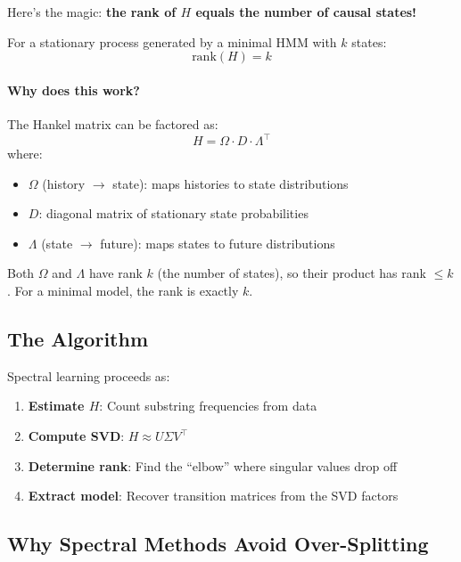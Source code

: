 \documentclass[11pt,a4paper]{article}
\theoremstyle{definition}
\theoremstyle{plain}
\begin{document}
Here's the magic: \textbf{the rank of $H$ equals the number of causal states!}

\begin{theorembox}[title=Hankel Rank Theorem]
For a stationary process generated by a minimal HMM with $k$ states:
\begin{equation}
    \text{rank}(H) = k
\end{equation}
\end{theorembox}

\paragraph{Why does this work?} The Hankel matrix can be factored as:
\begin{equation}
    H = \Omega \cdot D \cdot \Lambda^\top
\end{equation}
where:
\begin{itemize}[nosep]
    \item $\Omega$ (history $\to$ state): maps histories to state distributions
    \item $D$: diagonal matrix of stationary state probabilities
    \item $\Lambda$ (state $\to$ future): maps states to future distributions
\end{itemize}

Both $\Omega$ and $\Lambda$ have rank $k$ (the number of states), so their product has rank $\leq k$. For a minimal model, the rank is exactly $k$.

\subsection{The Algorithm}

Spectral learning proceeds as:

\begin{enumerate}
    \item \textbf{Estimate $H$}: Count substring frequencies from data
    \item \textbf{Compute SVD}: $H \approx U \Sigma V^\top$
    \item \textbf{Determine rank}: Find the ``elbow'' where singular values drop off
    \item \textbf{Extract model}: Recover transition matrices from the SVD factors
\end{enumerate}

\subsection{Why Spectral Methods Avoid Over-Splitting}
\end{document}
